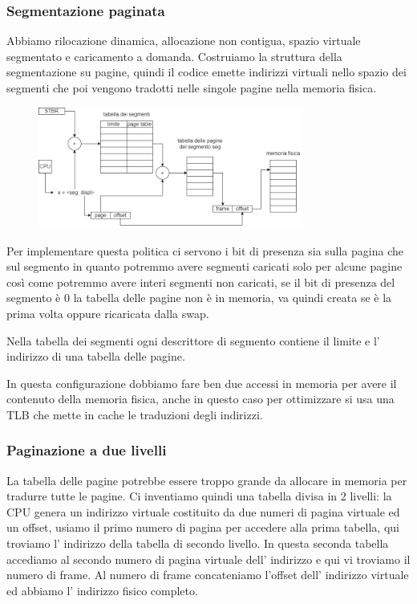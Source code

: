 \subsubsection{Segmentazione paginata}
Abbiamo rilocazione dinamica, allocazione non contigua, spazio virtuale segmentato e caricamento a domanda.
Costruiamo la struttura della segmentazione su pagine, quindi il codice emette indirizzi virtuali nello spazio dei segmenti che poi vengono tradotti nelle singole pagine nella memoria fisica.

\begin{figure}[H]
    \centering
    \includegraphics[width=330px]{images/9_Gestione_della_memoria/segmentazione_paginata.png}
\end{figure}
Per implementare questa politica ci servono i bit di presenza sia sulla pagina che sul segmento in quanto potremmo avere segmenti caricati solo per alcune pagine così come potremmo avere interi segmenti non caricati, se il bit di presenza del segmento è 0 la tabella delle pagine non è in memoria, va quindi creata se è la prima volta oppure ricaricata dalla swap.

Nella tabella dei segmenti ogni descrittore di segmento contiene il limite e l' indirizzo di una tabella delle pagine.

In questa configurazione dobbiamo fare ben due accessi in memoria per avere il contenuto della memoria fisica, anche in questo caso per ottimizzare si usa una TLB che mette in cache le traduzioni degli indirizzi.

\subsubsection{Paginazione a due livelli}
La tabella delle pagine potrebbe essere troppo grande da allocare in memoria per tradurre tutte le pagine.
Ci inventiamo quindi una tabella divisa in 2 livelli:
la CPU genera un indirizzo virtuale costituito da due numeri di pagina virtuale ed un offset, usiamo il primo numero di pagina per accedere alla prima tabella, qui troviamo l' indirizzo della tabella di secondo livello.
In questa seconda tabella accediamo al secondo numero di pagina virtuale dell' indirizzo e qui vi troviamo il numero di frame.
Al numero di frame concateniamo l'offset dell' indirizzo virtuale ed abbiamo l' indirizzo fisico completo.

